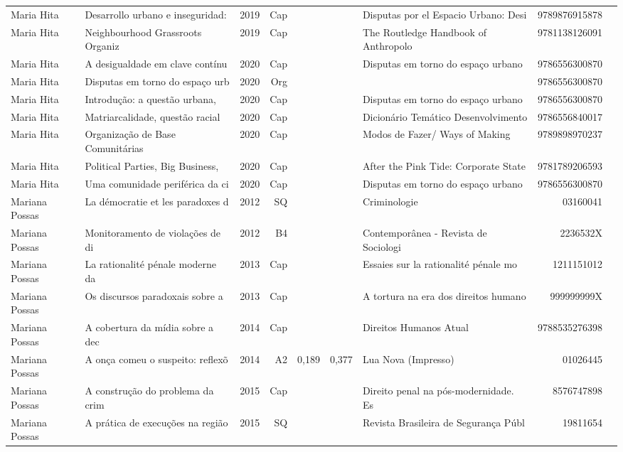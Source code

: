 \documentclass[12pt,brazil]{article}\usepackage[]{graphicx}\usepackage[]{xcolor}
\begin{document}
\begin{longtable}{lllrrllrr}
Maria Hita & Desarrollo urbano e inseguridad: & 2019 & Cap &  &  & Disputas por el Espacio Urbano: Desi & 9789876915878 \\
Maria Hita & Neighbourhood Grassroots Organiz & 2019 & Cap &  &  & The Routledge Handbook of Anthropolo & 9781138126091 \\
Maria Hita & A desigualdade em clave contínu & 2020 & Cap &  &  & Disputas em torno do espaço urbano  & 9786556300870 \\
Maria Hita & Disputas em torno do espaço urb & 2020 & Org &  &  &  & 9786556300870 \\
Maria Hita & Introdução: a questão urbana, & 2020 & Cap &  &  & Disputas em torno do espaço urbano  & 9786556300870 \\
Maria Hita & Matriarcalidade, questão racial  & 2020 & Cap &  &  & Dicionário Temático Desenvolvimento  & 9786556840017 \\
Maria Hita & Organização de Base Comunitárias & 2020 & Cap &  &  & Modos de Fazer/ Ways of Making & 9789898970237 \\
Maria Hita & Political Parties, Big Business, & 2020 & Cap &  &  & After the Pink Tide: Corporate State & 9781789206593 \\
Maria Hita & Uma comunidade periférica da ci & 2020 & Cap &  &  & Disputas em torno do espaço urbano  & 9786556300870 \\
Mariana Possas & La démocratie et les paradoxes d & 2012 & SQ &  &  & Criminologie & 03160041 \\
Mariana Possas & Monitoramento de violações de di & 2012 & B4 &  &  & Contemporânea - Revista de Sociologi & 2236532X \\
Mariana Possas & La rationalité pénale moderne da & 2013 & Cap &  &  & Essaies sur la rationalité pénale mo & 1211151012 \\
Mariana Possas & Os discursos paradoxais sobre a  & 2013 & Cap &  &  & A tortura na era dos direitos humano & 999999999X \\
Mariana Possas & A cobertura da mídia sobre a dec & 2014 & Cap &  &  & Direitos Humanos Atual & 9788535276398 \\
Mariana Possas & A onça comeu o suspeito: reflexõ & 2014 & A2 & 0,189 & 0,377 & Lua Nova (Impresso) & 01026445 \\
Mariana Possas & A construção do problema da crim & 2015 & Cap &  &  & Direito penal na pós-modernidade. Es & 8576747898 \\
Mariana Possas & A prática de execuções na região & 2015 & SQ &  &  & Revista Brasileira de Segurança Públ & 19811654 \\

\end{longtable}
\end{document}
